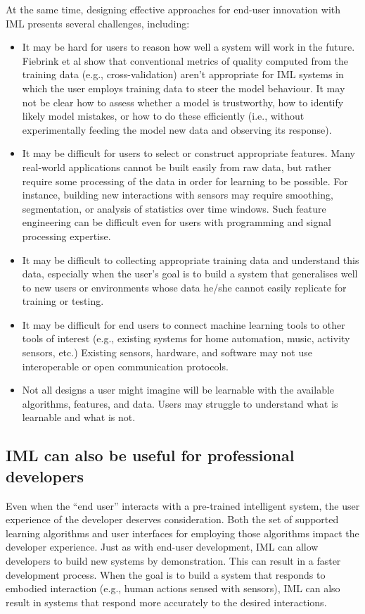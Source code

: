 \documentclass[letterpaper]{article}
\begin{document}
At the same time, designing effective approaches for end-user innovation with IML presents several challenges, including: 
\begin{itemize}
\item It may be hard for users to reason how well a system will work in the future. Fiebrink et al \citeyear{fiebrink2011human} show that conventional metrics of quality computed from the training data (e.g., cross-validation) aren't appropriate for IML systems in which the user employs training data to steer the model behaviour. It may not be clear how to assess whether a model is trustworthy, how to identify likely model mistakes, or how to do these efficiently (i.e., without experimentally feeding the model new data and observing its response).
\item It may be difficult for users to select or construct appropriate features. Many real-world applications cannot be built easily from raw data, but rather require some processing of the data in order for learning to be possible. For instance, building new interactions with sensors may require smoothing, segmentation, or analysis of statistics over time windows. Such feature engineering can be difficult even for users with programming and signal processing expertise. 
\item It may be difficult to collecting appropriate training data and understand this data, especially when the user's goal is to build a system that generalises well to new users or environments whose data he/she cannot easily replicate for training or testing.
\item It may be difficult for end users to connect machine learning tools to other tools of interest (e.g., existing systems for home automation, music, activity sensors, etc.) Existing sensors, hardware, and software may not use interoperable or open communication protocols.
\item Not all designs a user might imagine will be learnable with the available algorithms, features, and data. Users may struggle to understand what is learnable and what is not.
\end{itemize}



\subsection{IML can also be useful for professional developers} Even when the ``end user'' interacts with a pre-trained intelligent system, the user experience of the developer deserves consideration. Both the set of supported learning algorithms and user interfaces for employing those algorithms impact the developer experience. Just as with end-user development, IML can allow developers to build new systems by demonstration. This can result in a faster development process. When the goal is to build a system that responds to embodied interaction (e.g., human actions sensed with sensors), IML can also result in systems that respond more accurately to the desired interactions.
\end{document}
